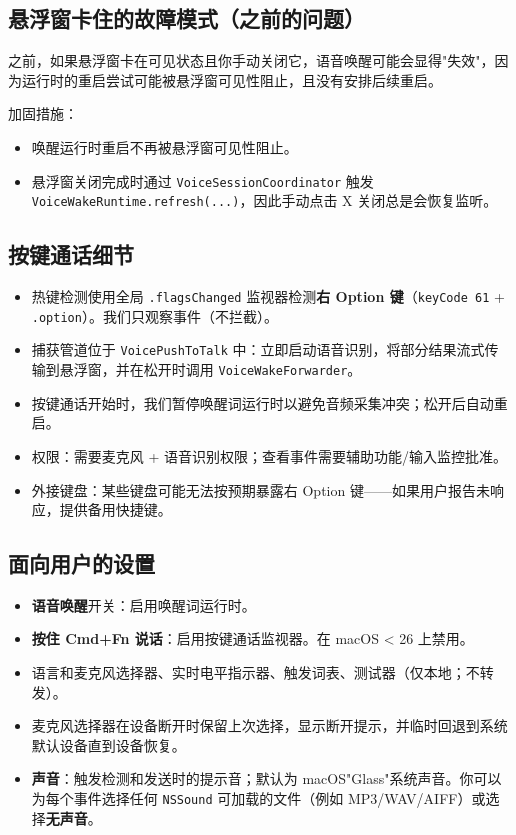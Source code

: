 \subsection{悬浮窗卡住的故障模式（之前的问题）}


之前，如果悬浮窗卡在可见状态且你手动关闭它，语音唤醒可能会显得"失效"，因为运行时的重启尝试可能被悬浮窗可见性阻止，且没有安排后续重启。

加固措施：

\begin{itemize}
  \item 唤醒运行时重启不再被悬浮窗可见性阻止。
  \item 悬浮窗关闭完成时通过 \texttt{VoiceSessionCoordinator} 触发 \texttt{VoiceWakeRuntime.refresh(...)}，因此手动点击 X 关闭总是会恢复监听。
\end{itemize}


\subsection{按键通话细节}


\begin{itemize}
  \item 热键检测使用全局 \texttt{.flagsChanged} 监视器检测\textbf{右 Option 键}（\texttt{keyCode 61} + \texttt{.option}）。我们只观察事件（不拦截）。
  \item 捕获管道位于 \texttt{VoicePushToTalk} 中：立即启动语音识别，将部分结果流式传输到悬浮窗，并在松开时调用 \texttt{VoiceWakeForwarder}。
  \item 按键通话开始时，我们暂停唤醒词运行时以避免音频采集冲突；松开后自动重启。
  \item 权限：需要麦克风 + 语音识别权限；查看事件需要辅助功能/输入监控批准。
  \item 外接键盘：某些键盘可能无法按预期暴露右 Option 键——如果用户报告未响应，提供备用快捷键。
\end{itemize}


\subsection{面向用户的设置}


\begin{itemize}
  \item \textbf{语音唤醒}开关：启用唤醒词运行时。
  \item \textbf{按住 Cmd+Fn 说话}：启用按键通话监视器。在 macOS < 26 上禁用。
  \item 语言和麦克风选择器、实时电平指示器、触发词表、测试器（仅本地；不转发）。
  \item 麦克风选择器在设备断开时保留上次选择，显示断开提示，并临时回退到系统默认设备直到设备恢复。
  \item \textbf{声音}：触发检测和发送时的提示音；默认为 macOS"Glass"系统声音。你可以为每个事件选择任何 \texttt{NSSound} 可加载的文件（例如 MP3/WAV/AIFF）或选择\textbf{无声音}。
\end{itemize}


